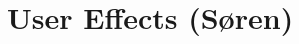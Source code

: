 \section[User Effects]{User Effects (Søren)}

\def\legendfooter{\scriptsize{(1) Monopole (2) Triangle-feed (3) Dual-feed. \textcolor{bb}{Free-space}, \textcolor{gg}{Data}, \textcolor{rr}{Play}, \textcolor{cc}{Talk}. Frequency in MHz.}}
\def\emptyline{\textcolor{white}{Empty}}
